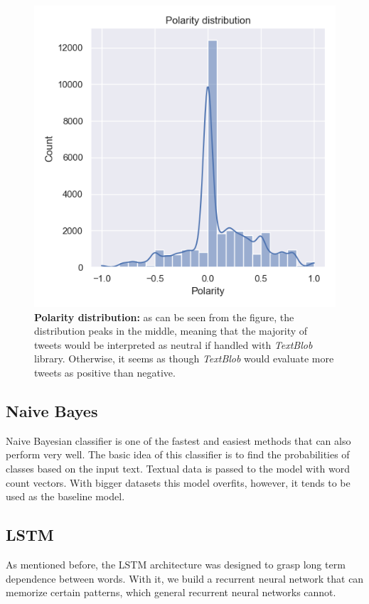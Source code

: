 \documentclass[conference]{IEEEtran}
\begin{document}
\begin{figure}[hbt!]\centering
\centering
\includegraphics[width=\linewidth]{polarity-distr}
\caption{\textbf{Polarity distribution:} as can be seen from the figure, the distribution peaks in the middle, meaning that the majority of tweets would be interpreted as neutral if handled with \textit{TextBlob} library. Otherwise, it seems as though \textit{TextBlob} would evaluate more tweets as positive than negative.}
\label{pic123}
\end{figure}

\subsection{Naive Bayes}
Naive Bayesian classifier is one of the fastest and easiest methods that can also perform very well. The basic idea of this classifier is to find the probabilities of classes based on the input text. Textual data is passed to the model with word count vectors. With bigger datasets this model overfits, however, it tends to be used as the baseline model.

\subsection{LSTM}
As mentioned before, the LSTM architecture was designed to grasp long term dependence between words. With it, we build a recurrent neural network that can memorize certain patterns, which general recurrent neural networks cannot.
\end{document}
